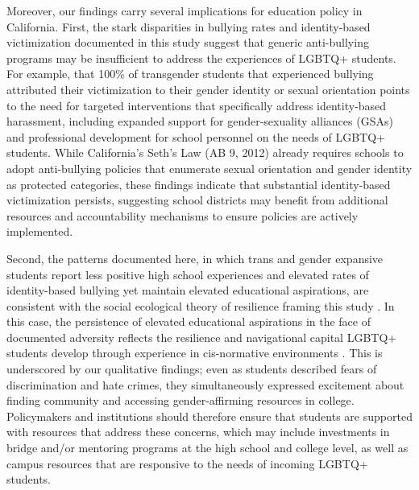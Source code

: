 Moreover, our findings carry several implications for education policy
in California. First, the stark disparities in bullying rates and
identity-based victimization documented in this study suggest that
generic anti-bullying programs may be insufficient to address the
experiences of LGBTQ+ students. For example, that 100\% of transgender
students that experienced bullying attributed their victimization to
their gender identity or sexual orientation points to the need for
targeted interventions that specifically address identity-based
harassment, including expanded support for gender-sexuality alliances
(GSAs) and professional development for school personnel on the needs of
LGBTQ+ students. While California's Seth's Law (AB 9, 2012) already
requires schools to adopt anti-bullying policies that enumerate sexual
orientation and gender identity as protected categories, these findings
indicate that substantial identity-based victimization persists,
suggesting school districts may benefit from additional resources and
accountability mechanisms to ensure policies are actively implemented.

Second, the patterns documented here, in which trans and gender
expansive students report less positive high school experiences and
elevated rates of identity-based bullying yet maintain elevated
educational aspirations, are consistent with the social ecological
theory of resilience framing this study \citep{ungar2011a}. In this
case, the persistence of elevated educational aspirations in the face of
documented adversity reflects the resilience and navigational capital
LGBTQ+ students develop through experience in cis-normative environments
\citep{pennell2016a}. This is underscored by our qualitative findings; even
as students described fears of discrimination and hate crimes, they
simultaneously expressed excitement about finding community and
accessing gender-affirming resources in college. Policymakers and
institutions should therefore ensure that students are supported with
resources that address these concerns, which may include investments in
bridge and/or mentoring programs at the high school and college level,
as well as campus resources that are responsive to the needs of incoming
LGBTQ+ students.

